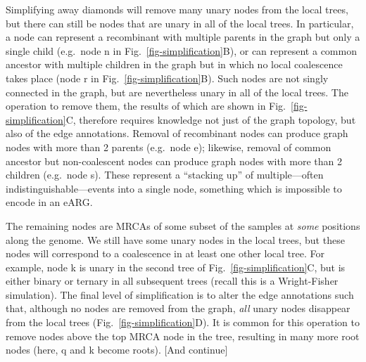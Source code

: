 \documentclass{article}
\begin{document}
Simplifying away diamonds will remove many unary nodes from the
local trees, but there can still be nodes that are unary in all
of the local trees. In particular, a node can represent a recombinant
with multiple parents in the graph but only a single child (e.g.\ node \textsf{n}
in Fig.~\ref{fig-simplification}B), or can represent a common ancestor with
multiple children in the graph but in which no local coalescence takes place
(node \textsf{r} in Fig.~\ref{fig-simplification}B).
Such nodes are not singly connected in the graph, but are nevertheless unary in
all of the local trees. The operation to remove them,
the results of which are shown in Fig.~\ref{fig-simplification}C,
therefore requires knowledge not just of the graph topology, but also of the
edge annotations. Removal of recombinant nodes can produce graph nodes with
more than 2 parents (e.g.~node \textsf{e}); likewise, removal of
common ancestor but non-coalescent nodes can produce graph nodes with
more than 2 children (e.g.~node \textsf{s}). These represent a ``stacking up'' of
multiple---often indistinguishable---events into a single node,
something which is impossible to encode in an eARG.



The remaining nodes are MRCAs of some subset of the samples
at \emph{some} positions along the genome. We still have
some unary nodes in the local trees, but these nodes will
correspond to a coalescence in at least one other
local tree. For example, node  \textsf{k} is unary in the second tree
of Fig.~\ref{fig-simplification}C, but is either binary
or ternary in all subsequent trees (recall this is a Wright-Fisher
simulation). The final level of simplification is to alter the edge annotations
such that, although no nodes are removed from the graph, \emph{all}
unary nodes disappear from the local trees (Fig.~\ref{fig-simplification}D).
It is common for this operation to remove nodes above the top MRCA node
in the tree, resulting in many more root nodes (here, \textsf{q} and \textsf{k}
become roots). [And continue]
\end{document}
